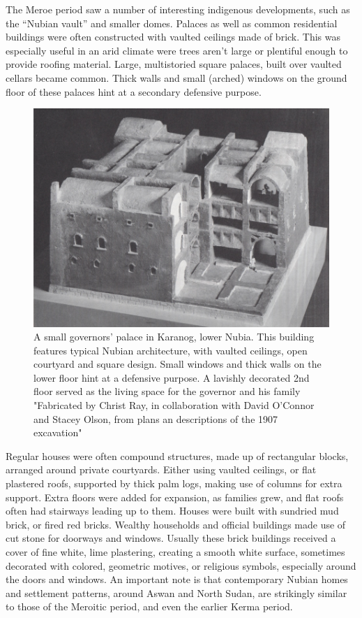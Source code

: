 \documentclass[a4paper,12pt]{scrreprt}
\begin{document}
The Meroe period saw a number of interesting indigenous developments, such as the “Nubian vault” and smaller domes. Palaces as well as common residential buildings were often constructed with vaulted ceilings made of brick. This was especially useful in an arid climate were trees aren’t large or plentiful enough to provide roofing material. Large, multistoried square palaces, built over vaulted cellars became common. Thick walls and small (arched) windows on the ground floor of these palaces hint at a secondary defensive purpose.

\begin{figure}[H]
	\centering
	\includegraphics[width=\textwidth]{img/civic_center/governor_palace_karanog}
	\caption{A small governors' palace in Karanog, lower Nubia. This building features typical Nubian architecture, with vaulted ceilings, open courtyard and square design. Small windows and thick walls on the lower floor hint at a defensive purpose. A lavishly decorated 2nd floor served as the living space for the governor and his family "Fabricated by Christ Ray, in collaboration with David O'Connor and Stacey Olson, from plans an descriptions of the 1907 excavation"}
\end{figure}

Regular houses were often compound structures, made up of rectangular blocks, arranged around private courtyards. Either using vaulted ceilings, or flat plastered roofs, supported by thick palm logs, making use of columns for extra support. Extra floors were added for expansion, as families grew, and flat roofs often had stairways leading up to them. Houses were built with sundried mud brick, or fired red bricks. Wealthy households and official buildings made use of cut stone for doorways and windows. Usually these brick buildings received a cover of fine white, lime plastering, creating a smooth white surface, sometimes decorated with colored, geometric motives, or religious symbols, especially around the doors and windows. An important note is that contemporary Nubian homes and settlement patterns, around Aswan and North Sudan, are strikingly similar to those of the Meroitic period, and even the earlier Kerma period. 
\end{document}
